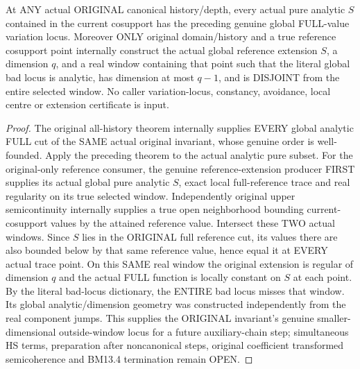\begin{theorem}
\label{hir:original-full-value-reference-extension-variation-avoids-window}
\leanok
At ANY actual ORIGINAL canonical history/depth, every actual pure analytic
$S$ contained in the current cosupport has the preceding genuine global
FULL-value variation locus. Moreover ONLY original domain/history and a true
reference cosupport point internally construct the actual global reference
extension $S$, a dimension $q$, and a real window containing that point such
that the literal global bad locus is analytic, has dimension at most $q-1$,
and is DISJOINT from the entire selected window. No caller variation-locus,
constancy, avoidance, local centre or extension certificate is input.
\end{theorem}
\begin{proof}
The original all-history theorem internally supplies EVERY global analytic
FULL cut of the SAME actual original invariant, whose genuine order is
well-founded. Apply the preceding theorem to the actual analytic pure subset.
For the original-only reference consumer, the genuine reference-extension
producer FIRST supplies its actual global pure analytic $S$, exact local
full-reference trace and real regularity on its true selected window.
Independently original upper semicontinuity internally supplies a true open
neighborhood bounding current-cosupport values by the attained reference
value. Intersect these TWO actual windows. Since $S$ lies in the ORIGINAL
full reference cut, its values there are also bounded below by that same
reference value, hence equal it at EVERY actual trace point. On this SAME
real window the original extension is regular of dimension $q$ and the
actual FULL function is locally constant on $S$ at each point. By the
literal bad-locus dictionary, the ENTIRE bad locus misses that window.
Its global analytic/dimension geometry was constructed independently from
the real component jumps. This supplies the ORIGINAL invariant's genuine
smaller-dimensional outside-window locus for a future auxiliary-chain step;
simultaneous HS terms, preparation after noncanonical steps, original
coefficient transformed semicoherence and BM13.4 termination remain OPEN.
\end{proof}

